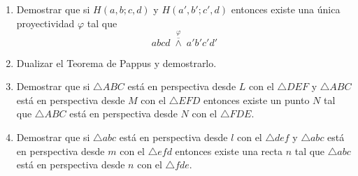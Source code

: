 \documentclass[12pt]{report}
\numberwithin{section}{chapter}
\begin{document}
\begin{enumerate}
\item Demostrar que si $H(a,b;c,d)$ y $H(a',b';c',d)$ entonces existe una única proyectividad $\varphi$ tal que
$$abcd\;\overset{\varphi}{\overline{\wedge}}\; a'b'c'd'$$

\item Dualizar el Teorema de Pappus y demostrarlo.

\item Demostrar que si $\triangle ABC$ está en perspectiva desde $L$ con el $\triangle DEF$ y $\triangle ABC$ está en perspectiva desde $M$ con el $\triangle EFD$ entonces existe un punto $N$ tal que $\triangle ABC$ está en perspectiva desde $N$ con el $\triangle FDE$.

\item Demostrar que si $\triangle abc$ está en perspectiva desde $l$ con el $\triangle def$ y $\triangle abc$ está en perspectiva desde $m$ con el $\triangle efd$ entonces existe una recta $n$ tal que $\triangle abc$ está en perspectiva desde $n$ con el $\triangle fde$.
\end{enumerate}
\end{document}
